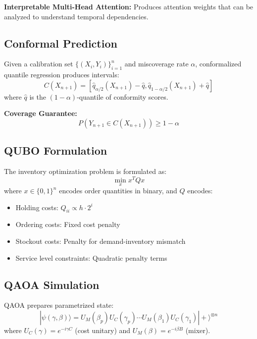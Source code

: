 \documentclass{article}
\begin{document}
\textbf{Interpretable Multi-Head Attention:} Produces attention weights that can be 
analyzed to understand temporal dependencies.

\subsection{Conformal Prediction}

Given a calibration set $\{(X_i, Y_i)\}_{i=1}^n$ and miscoverage rate $\alpha$, 
conformalized quantile regression produces intervals:
\begin{equation}
    C(X_{n+1}) = [\hat{q}_{\alpha/2}(X_{n+1}) - \hat{q}, \hat{q}_{1-\alpha/2}(X_{n+1}) + \hat{q}]
\end{equation}
where $\hat{q}$ is the $(1-\alpha)$-quantile of conformity scores.

\textbf{Coverage Guarantee:}
\begin{equation}
    P(Y_{n+1} \in C(X_{n+1})) \geq 1 - \alpha
\end{equation}

\subsection{QUBO Formulation}

The inventory optimization problem is formulated as:
\begin{equation}
    \min_x x^T Q x
\end{equation}
where $x \in \{0,1\}^n$ encodes order quantities in binary, and $Q$ encodes:
\begin{itemize}
    \item Holding costs: $Q_{ii} \propto h \cdot 2^i$
    \item Ordering costs: Fixed cost penalty
    \item Stockout costs: Penalty for demand-inventory mismatch
    \item Service level constraints: Quadratic penalty terms
\end{itemize}

\subsection{QAOA Simulation}

QAOA prepares parametrized state:
\begin{equation}
    |\psi(\gamma, \beta)\rangle = U_M(\beta_p) U_C(\gamma_p) \cdots U_M(\beta_1) U_C(\gamma_1) |+\rangle^{\otimes n}
\end{equation}
where $U_C(\gamma) = e^{-i\gamma C}$ (cost unitary) and $U_M(\beta) = e^{-i\beta B}$ (mixer).
\end{document}
